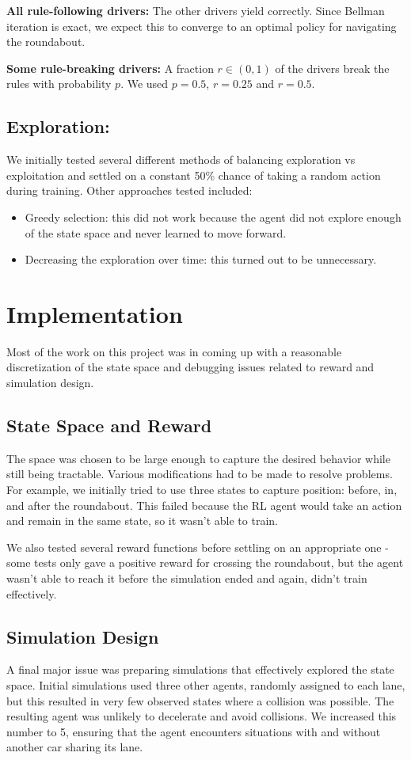 \documentclass[conference]{IEEEtran}
\begin{document}
\textbf{All rule-following drivers:} The other drivers yield correctly. Since Bellman iteration is exact, we expect this to converge to an optimal policy for navigating the roundabout.

\textbf{Some rule-breaking drivers:} A fraction $r\in (0,1)$ of the drivers break the rules with probability $p$. We used $p=0.5$, $r=0.25$ and $r=0.5$.

\subsection*{Exploration:} We initially tested several different methods of balancing exploration vs exploitation and settled on a constant 50\% chance of taking a random action during training. Other approaches tested included:
\begin{itemize}
	\item Greedy selection: this did not work because the agent did not explore enough of the state space and never learned to move forward.
	\item Decreasing the exploration over time: this turned out to be unnecessary.
\end{itemize}

\section{Implementation} Most of the work on this project was in coming up with a reasonable discretization of the state space and debugging issues related to reward and simulation design.

\subsection*{State Space and Reward} The space was chosen to be large enough to capture the desired behavior while still being tractable. Various modifications had to be made to resolve problems.
For example, we initially tried to use three states to capture position: before, in, and after the roundabout. This failed because the RL agent would take an action and remain in the same state, so it wasn't able to train.

We also tested several reward functions before settling on an appropriate one - some tests only gave a positive reward for crossing the roundabout, but the agent wasn't able to reach it before the simulation ended and again, didn't train effectively.

\subsection*{Simulation Design} A final major issue was preparing simulations that effectively explored the state space. Initial simulations used three other agents, randomly assigned to each lane, but this resulted in very few observed states where a collision was possible. The resulting agent was unlikely to decelerate and avoid collisions. We increased this number to 5, ensuring that the agent encounters situations with and without another car sharing its lane.
\end{document}
